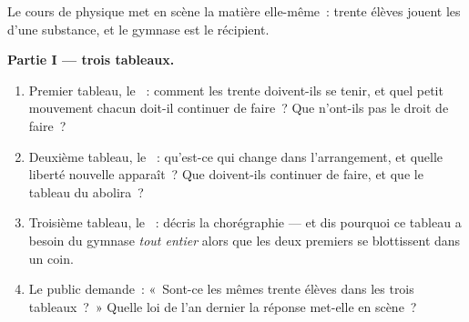 \begin{problem}\label{pb:g7:states-of-matter:1}
Le cours de physique met en scène la matière elle-même~: trente
élèves jouent les  d'une substance, et le gymnase est le
récipient.

\medskip\noindent\textbf{Partie I --- trois tableaux.}
\begin{enumerate}
  \item Premier tableau, le ~: comment les trente
        doivent-ils se tenir, et quel petit mouvement chacun
        doit-il continuer de faire~? Que n'ont-ils pas le droit de
        faire~?
  \item Deuxième tableau, le ~: qu'est-ce qui change dans
        l'arrangement, et quelle liberté nouvelle apparaît~? Que
        doivent-ils continuer de faire, et que le tableau du 
        abolira~?
  \item Troisième tableau, le ~: décris la chorégraphie --- et
        dis pourquoi ce tableau a besoin du gymnase \emph{tout
        entier} alors que les deux premiers se blottissent dans un
        coin.
  \item Le public demande~: «~Sont-ce les mêmes trente élèves dans
        les trois tableaux~?~» Quelle loi de l'an dernier la
        réponse met-elle en scène~?
\end{enumerate}


\end{problem}
